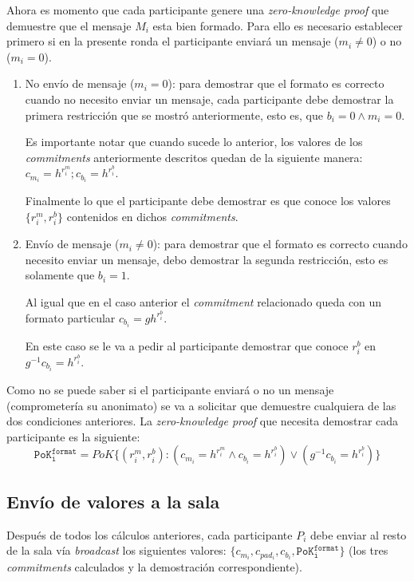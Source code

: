 Ahora es momento que cada participante genere una \emph{zero-knowledge proof} que demuestre que el mensaje $M_i$ esta bien formado. Para ello es necesario establecer primero si en la presente ronda el participante enviará un mensaje ($m_i \neq 0$) o no ($m_i = 0$).

\begin{enumerate}
    \item No envío de mensaje ($m_i = 0$): para demostrar que el formato es correcto cuando no necesito enviar un mensaje, cada participante debe demostrar la primera restricción que se mostró anteriormente, esto es, que $b_i = 0 \land m_i = 0$.
    
    Es importante notar que cuando sucede lo anterior, los valores de los \emph{commitments} anteriormente descritos quedan de la siguiente manera: $c_{m_i} = h^{r_i^m}; c_{b_i} = h^{r_i^b}$.
    
    Finalmente lo que el participante debe demostrar es que conoce los valores $\{r_i^m, r_i^b\}$ contenidos en dichos \emph{commitments}.
    \item Envío de mensaje ($m_i \neq 0$): para demostrar que el formato es correcto cuando necesito enviar un mensaje, debo demostrar la segunda restricción, esto es solamente que $b_i = 1$.
    
    Al igual que en el caso anterior el \emph{commitment} relacionado queda con un formato particular $c_{b_i} = g h^{r_i^b}$.
    
    En este caso se le va a pedir al participante demostrar que conoce $r_i^b$ en $g^{-1} c_{b_i} = h^{r_i^b}$.
\end{enumerate}

Como no se puede saber si el participante enviará o no un mensaje (comprometería su anonimato) se va a solicitar que demuestre cualquiera de las dos condiciones anteriores. La \emph{zero-knowledge proof} que necesita demostrar cada participante es la siguiente: $$\mathtt{PoK_i^{format}} = PoK\{(r_i^m, r_i^b) : (c_{m_i} = h^{r_i^m} \land c_{b_i} = h^{r_i^b}) \lor (g^{-1} c_{b_i} = h^{r_i^b})\}$$

\subsection{Envío de valores a la sala}

Después de todos los cálculos anteriores, cada participante $P_i$ debe enviar al resto de la sala vía \emph{broadcast} los siguientes valores: $\{c_{m_i}, c_{pad_i}, c_{b_i}, \mathtt{PoK_i^{format}}\}$ (los tres \emph{commitments} calculados y la demostración correspondiente).


